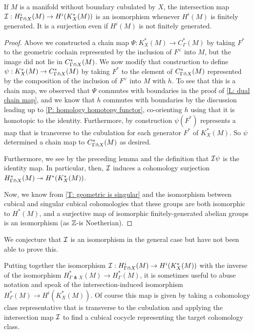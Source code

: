 \begin{theorem}\label{T: intersection qi}
If $M$ is a manifold without boundary cubulated by $X$, the intersection map $\mathcal{I}: H^i_{\Gamma\pitchfork X}(M) \to H^i(K_X^*(M))$ is an isomorphism whenever $H^i(M)$ is finitely generated. It is a surjection even if $H^i(M)$ is not finitely generated.
\end{theorem}
\begin{proof}
Above we constructed a chain map $\Psi:K_X^*(M) \to C_\Gamma^*(M)$ by taking $F^*$ to the geometric cochain represented by the inclusion of $F^\vee$ into $M$, but the image did not lie in $C^*_{\Gamma\pitchfork X}(M)$. We now modify that construction to define $\psi:K_X^*(M) \to C_{\Gamma\pitchfork X}^*(M)$ by taking $F^*$ to the element of $C^*_{\Gamma\pitchfork X}(M)$ represented by the composition of the inclusion of $F^\vee$ into $M$ with $h$. To see that this is a chain map, we observed that $\Psi$ commutes with boundaries in the proof of \cref{L: dual chain map}, and we know that $h$ commutes with boundaries by the discussion leading up to \cref{P: homology homotopy functor}, co-orienting $h$ using that it is homotopic to the identity. Furthermore, by construction $\psi(F^*)$ represents a map that is transverse to the cubulation for each generator $F^*$ of $K_X^*(M)$. So $\psi$ determined a chain map to $C_{\Gamma\pitchfork X}^*(M)$ as desired.

 Furthermore, we see by the preceding lemma and the definition that $\mathcal{I}\psi$ is the identity map. In particular, then, $\mathcal{I}$ induces a cohomology surjection $H^*_{\Gamma\pitchfork X}(M)\twoheadrightarrow H^*(K_X^*(M))$.

Now, we know from \cref{T: geometric is singular} and the isomorphism between cubical and singular cubical cohomologies that these groups are both isomorphic to $H^*(M)$, and a surjective map of isomorphic finitely-generated abelian groups is an isomorphism (as $\mathbb{Z}$-is Noetherian).
\end{proof}

We conjecture that $\mathcal{I}$ is an isomorphism in the general case but have not been able to prove this.


\begin{remark}\label{R: intersection map extension}
Putting together the isomorphism $\mathcal{I}: H^i_{\Gamma\pitchfork X}(M) \to H^i(K_X^*(M))$ with the inverse of the isomorphism $H^*_{\Gamma \pitchfork X}(M) \to H^*_\Gamma(M)$, it is sometimes useful to abuse notation and speak of the intersection-induced isomorphism
 $H^*_\Gamma(M) \to H^i(K_X^*(M))$. Of course this map is given by taking a cohomology class representative that is transverse to the cubulation and applying the intersection map $\mathcal{I}$ to find a cubical cocycle representing the target cohomology class.
\end{remark}




